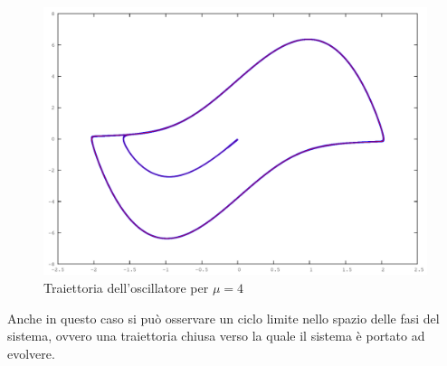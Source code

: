 \documentclass[a4paper,11pt]{report}
\begin{document}
\begin{figure}[h!]
\centering
\includegraphics[width=\textwidth]{vanderpol}
\caption{Traiettoria dell'oscillatore per $\mu = 4$}
\label{fig:vanderpol}
\end{figure}
Anche in questo caso si può osservare un ciclo limite nello spazio delle fasi del sistema, ovvero una traiettoria chiusa verso la quale il sistema è portato ad evolvere.
\end{document}
